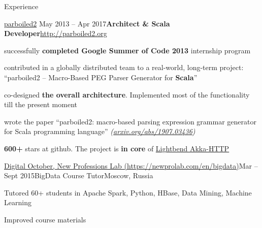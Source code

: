 \documentclass{resume} %
\newif\iflongversion
\begin{document}
\iflongversion

\pagebreak


\begin{rSection}{Experience}

\begin{samepage}
\begin{rSubsection}
{\href{http://parboiled2.org}{parboiled2}}
{May 2013 -- Apr 2017}{\textbf{Architect \& Scala Developer}}{\href{http://parboiled2.org}{http://parboiled2.org}}
\item successfully \textbf{completed Google Summer of Code 2013} internship program
\item contributed in a globally distributed team to a real-world, long-term project: ``parboiled2 -- Macro-Based PEG Parser Generator for \textbf{Scala}''
\item co-designed \textbf{the overall architecture}. Implemented most of the functionality till the present moment
\item wrote the paper ``parboiled2: macro-based parsing expression grammar generator for Scala programming language''
\textit{(\href{https://arxiv.org/abs/1907.03436}{arxiv.org/abs/1907.03436})}
\item \textbf{600+} stars at github. The project is \textbf{in core} of
\href{https://doc.akka.io/docs/akka-http/current/}{Lightbend Akka-HTTP}
\end{rSubsection}
\end{samepage}

\begin{samepage}
\begin{rSubsection}{\href{https://newprolab.com/en/bigdata/}{Digital October, New Professions Lab
(https://newprolab.com/en/bigdata)}}{Mar -- Sept 2015}{BigData Course Tutor}{Moscow,
Russia}
\item Tutored 60+ students in Apache Spark, Python, HBase, Data Mining, Machine Learning
\item Improved course materials
\end{rSubsection}
\end{samepage}



\end{rSection}
\end{document}

